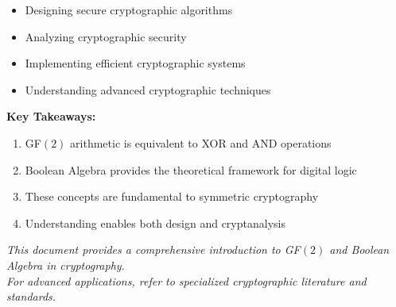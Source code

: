 \documentclass[11pt,a4paper]{article}
\begin{document}
\begin{itemize}
    \item Designing secure cryptographic algorithms
    \item Analyzing cryptographic security
    \item Implementing efficient cryptographic systems
    \item Understanding advanced cryptographic techniques
\end{itemize}

\begin{definitionbox}
\textbf{Key Takeaways:}
\begin{enumerate}
    \item GF$(2)$ arithmetic is equivalent to XOR and AND operations
    \item Boolean Algebra provides the theoretical framework for digital logic
    \item These concepts are fundamental to symmetric cryptography
    \item Understanding enables both design and cryptanalysis
\end{enumerate}
\end{definitionbox}

\vspace{2cm}

\begin{center}
\textit{This document provides a comprehensive introduction to GF$(2)$ and Boolean Algebra in cryptography.\\
For advanced applications, refer to specialized cryptographic literature and standards.}
\end{center}
\end{document}
